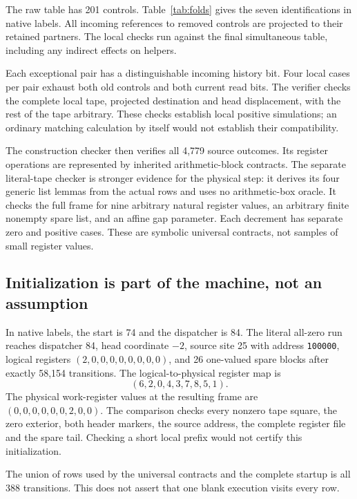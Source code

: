 \documentclass[11pt,letterpaper]{article}
\begin{document}
The raw table has 201 controls. Table~\ref{tab:folds} gives the seven
identifications in native labels. All incoming references to removed
controls are projected to their retained partners. The local checks run
against the final simultaneous table, including any indirect effects on
helpers.


Each exceptional pair has a distinguishable incoming history bit. Four
local cases per pair exhaust both old controls and both current read bits.
The verifier checks the complete local tape, projected destination and
head displacement, with the rest of the tape arbitrary. These checks
establish local positive simulations; an ordinary matching calculation
by itself would not establish their compatibility.

The construction checker then verifies all 4,779 source outcomes. Its
register operations are represented by inherited arithmetic-block
contracts. The separate literal-tape checker is stronger evidence for
the physical step: it derives its four generic list lemmas from the actual
rows and uses no arithmetic-box oracle. It checks the full frame for nine
arbitrary natural register values, an arbitrary finite nonempty spare
list, and an affine gap parameter. Each decrement has separate zero and
positive cases. These are symbolic universal contracts, not samples of
small register values.

\subsection{Initialization is part of the machine, not an assumption}

In native labels, the start is 74 and the dispatcher is 84. The literal
all-zero run reaches dispatcher 84, head coordinate $-2$, source site 25
with address \texttt{100000}, logical registers $(2,0,0,0,0,0,0,0,0)$,
and 26 one-valued spare blocks after exactly 58,154 transitions. The
logical-to-physical register map is
\[
                        (6,2,0,4,3,7,8,5,1).
\]
The physical work-register values at the resulting frame are
$(0,0,0,0,0,0,2,0,0)$. The comparison checks every nonzero tape square,
the zero exterior, both header markers, the source address, the complete
register file and the spare tail. Checking a short local prefix would
not certify this initialization.

The union of rows used by the universal contracts and the complete startup
is all 388 transitions. This does not assert that one blank execution visits
every row.
\end{document}
